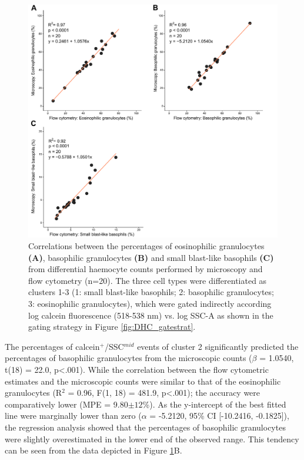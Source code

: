 \begin{figure}[H]
    \centering
    \includegraphics[width=1.0\textwidth]{figures/Gating strategy/SSC Calcein validation.pdf}
    \caption{Correlations between the percentages of eosinophilic granulocytes \textbf{(A)}, basophilic granulocytes \textbf{(B)} and small blast-like basophils \textbf{(C)} from differential haemocyte counts performed by microscopy and flow cytometry (n=20). The three cell types were differentiated as clusters 1-3 (1: small blast-like basophils; 2: basophilic granulocytes; 3: eosinophilic granulocytes), which were gated indirectly according log calcein fluorescence (518-538 nm) vs. log SSC-A as shown in the gating strategy in Figure \ref{fig:DHC_gatestrat}.}
    \label{fig:DHC_lin}
\end{figure}

\noindent The percentages of calcein$^{+}$/SSC$^{mid}$ events of cluster 2 significantly predicted the percentages of basophilic granulocytes from the microscopic counts ($\beta$ = 1.0540, t(18) = 22.0, p<.001). While the correlation between the flow cytometric estimates and the microscopic counts were similar to that of the eosinophilic granulocytes (R$^{2}$ = 0.96, F(1, 18) = 481.9, p<.001); the accuracy were comparatively lower (MPE = 9.80$\pm{12}$\%). As the y-intercept of the best fitted line were marginally lower than zero ($\alpha$ = -5.2120, 95\% CI [-10.2416, -0.1825]), the regression analysis showed that the percentages of basophilic granulocytes were slightly overestimated in the lower end of the observed range. This tendency can be seen from the data depicted in Figure \ref{fig:DHC_lin}B.

